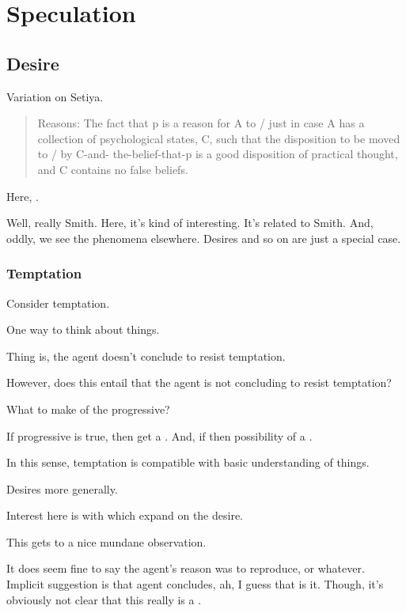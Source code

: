 \chapter{Speculation}
\label{cha:speculation}

\section{Desire}
\label{sec:desire}

\begin{note}
  Variation on Setiya.

  \begin{quote}
    Reasons: The fact that p is a reason for A to / just in case A has a collection of psychological states, C, such that the disposition to be moved to / by C-and- the-belief-that-p is a good disposition of practical thought, and C contains no false beliefs.
  \end{quote}

  Here, \fc{}.

  Well, really Smith.
  Here, it's kind of interesting.
  It's related to Smith.
  And, oddly, we see the phenomena elsewhere.
  Desires and so on are just a special case.
\end{note}

\subsection{Temptation}
\label{sec:temptation}

\begin{note}
  Consider temptation.

  One way to think about things.

  Thing is, the agent doesn't conclude to resist temptation.

  However, does this entail that the agent is not concluding to resist temptation?

  What to make of the progressive?

  If progressive is true, then get a \fc{}.
  And, if \fc{} then possibility of a \requ{}.

  In this sense, temptation is compatible with basic understanding of things.
\end{note}

\begin{note}
  Desires more generally.

  Interest here is with  which expand on the desire.

  This gets to a nice mundane observation.

  It does seem fine to say the agent's reason was to reproduce, or whatever.
  Implicit suggestion is that agent concludes, ah, I guess that is it.
  Though, it's obviously not clear that this really is a \fc{}.
\end{note}


